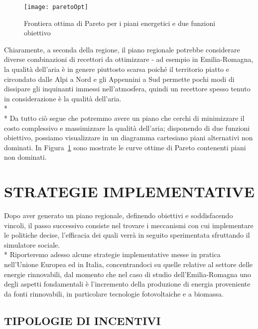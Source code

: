 \documentclass[12pt,a4paper,openright,twoside]{report}
\begin{document}
\begin{figure}[H]
	\centering
	\texttt{[image: paretoOpt]}
	\caption{Frontiera ottima di Pareto per i piani energetici e due funzioni obiettivo}
	\label{paretoOpt}
\end{figure}

Chiaramente, a seconda della regione, il piano regionale potrebbe considerare diverse combinazioni di recettori da ottimizzare - ad esempio in Emilia-Romagna, la qualità dell'aria è in genere piuttosto scarsa poiché il territorio piatto e circondato dalle Alpi a Nord e gli Appennini a Sud permette pochi modi di dissipare gli inquinanti immessi nell'atmosfera, quindi un recettore spesso tenuto in considerazione è la qualità dell'aria.\\*\\*
Da tutto ciò segue che potremmo avere un piano che cerchi di minimizzare il costo complessivo e massimizzare la qualità dell'aria; disponendo di due funzioni obiettivo, possiamo visualizzare in un diagramma cartesiano piani alternativi non dominati. In Figura~\ref{paretoOpt} sono mostrate le curve ottime di Pareto contenenti piani non dominati.

\section{\nohyphens{STRATEGIE IMPLEMENTATIVE}}
Dopo aver generato un piano regionale, definendo obiettivi e soddisfacendo vincoli, il passo successivo consiste nel trovare i meccanismi con cui implementare le politiche decise, l'efficacia dei quali verrà in seguito sperimentata sfruttando il simulatore sociale.\\*
Riporteremo adesso alcune strategie implementative messe in pratica nell'Unione Europea ed in Italia, concentrandoci su quelle relative al settore delle energie rinnovabili, dal momento che nel caso di studio dell'Emilia-Romagna uno degli aspetti fondamentali è l'incremento della produzione di energia proveniente da fonti rinnovabili, in particolare tecnologie fotovoltaiche e a biomassa.

\subsection[INCENTIVI]{\nohyphens{TIPOLOGIE DI INCENTIVI}}
\end{document}
